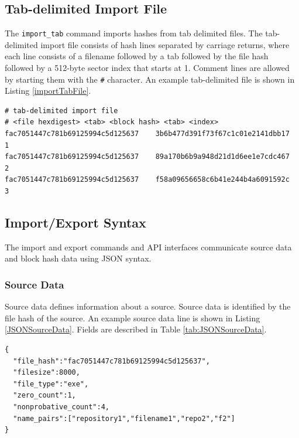 \documentclass[11pt,fleqn]{article} %
\begin{document}
\subsection{Tab-delimited Import File}
\label{TabFile}
The \verb+import_tab+ command imports hashes from tab delimited files.
The tab-delimited import file consists of hash lines separated by carriage returns, where each line consists of a filename followed by a tab followed by the file hash followed by a 512-byte sector index that starts at 1.  Comment lines are allowed by starting them with the \texttt{\#} character.
An example tab-delimited file is shown in Listing \ref{importTabFile}.\\

\lstset{style=customfile}
\begin{lstlisting}[float, caption={Example tab-delimited import file}, label=importTabFile]
# tab-delimited import file
# <file hexdigest> <tab> <block hash> <tab> <index>
fac7051447c781b69125994c5d125637    3b6b477d391f73f67c1c01e2141dbb17    1
fac7051447c781b69125994c5d125637    89a170b6b9a948d21d1d6ee1e7cdc467    2
fac7051447c781b69125994c5d125637    f58a09656658c6b41e244b4a6091592c    3
\end{lstlisting}

\subsection{Import/Export Syntax}
\label{ImportExportSyntax}
The import and export commands and API interfaces communicate source data and block hash data using JSON syntax.\\

\subsubsection{Source Data}
Source data defines information about a source. Source data is identified by the file hash of the source.  An example source data line is shown in Listing \ref{JSONSourceData}. Fields are described in Table \ref{tab:JSONSourceData}.\\

\lstset{style=customfile}
\begin{lstlisting}[float, caption={Example JSON source data used during import/export}, label=JSONSourceData]
{
  "file_hash":"fac7051447c781b69125994c5d125637",
  "filesize":8000,
  "file_type":"exe",
  "zero_count":1,
  "nonprobative_count":4,
  "name_pairs":["repository1","filename1","repo2","f2"]
}
\end{lstlisting}
\end{document}
